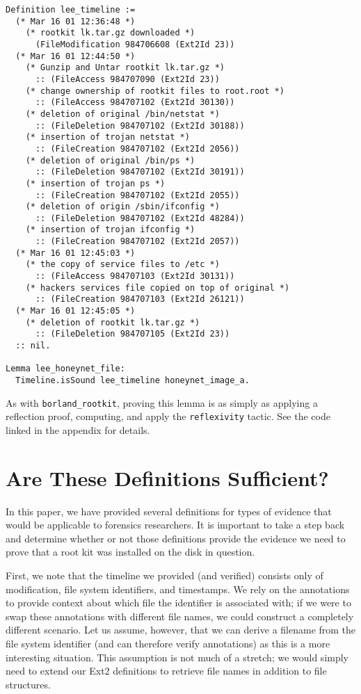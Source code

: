\documentclass[nocopyrightspace,preprint]{sigplanconf}
\begin{document}
\begin{lstlisting}
Definition lee_timeline :=
  (* Mar 16 01 12:36:48 *)
    (* rootkit lk.tar.gz downloaded *)
      (FileModification 984706608 (Ext2Id 23))
  (* Mar 16 01 12:44:50 *)
    (* Gunzip and Untar rootkit lk.tar.gz *)
      :: (FileAccess 984707090 (Ext2Id 23))
    (* change ownership of rootkit files to root.root *)
      :: (FileAccess 984707102 (Ext2Id 30130))
    (* deletion of original /bin/netstat *)
      :: (FileDeletion 984707102 (Ext2Id 30188))
    (* insertion of trojan netstat *)
      :: (FileCreation 984707102 (Ext2Id 2056))
    (* deletion of original /bin/ps *)
      :: (FileDeletion 984707102 (Ext2Id 30191))
    (* insertion of trojan ps *)
      :: (FileCreation 984707102 (Ext2Id 2055))
    (* deletion of origin /sbin/ifconfig *)
      :: (FileDeletion 984707102 (Ext2Id 48284))
    (* insertion of trojan ifconfig *)
      :: (FileCreation 984707102 (Ext2Id 2057))
  (* Mar 16 01 12:45:03 *)
    (* the copy of service files to /etc *)
      :: (FileAccess 984707103 (Ext2Id 30131))
    (* hackers services file copied on top of original *)
      :: (FileCreation 984707103 (Ext2Id 26121))
  (* Mar 16 01 12:45:05 *)
    (* deletion of rootkit lk.tar.gz *)
      :: (FileDeletion 984707105 (Ext2Id 23))
  :: nil.

Lemma lee_honeynet_file:
  Timeline.isSound lee_timeline honeynet_image_a.
\end{lstlisting}

As with {\tt borland\_rootkit}, proving this lemma is as simply as applying a
reflection proof, computing, and apply the {\tt reflexivity} tactic. See the
code linked in the appendix for details.


\section{Are These Definitions Sufficient?}
\label{sec:sufficient}

In this paper, we have provided several definitions for types of evidence that
would be applicable to forensics researchers. It is important to take a step
back and determine whether or not those definitions provide the evidence we
need to prove that a root kit was installed on the disk in question. 

First, we note that the timeline we provided (and verified) consists only of
modification, file system identifiers, and timestamps. We rely on the
annotations to provide context about which file the identifier is associated
with; if we were to swap these annotations with different file names, we could
construct a completely different scenario. Let us assume, however, that we can
derive a filename from the file system identifier (and can therefore verify
annotations) as this is a more interesting situation. This assumption is not
much of a stretch; we would simply need to extend our Ext2 definitions to
retrieve file names in addition to file structures.
\end{document}
